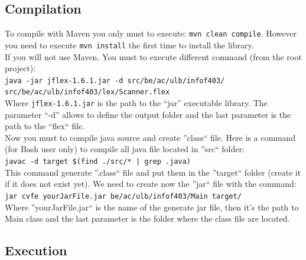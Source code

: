 \documentclass[a4paper,11pt]{article}
\begin{document}
  \subsection{Compilation}
    To compile with Maven you only must to execute: \verb|mvn clean compile|.  However you need to execute \verb|mvn install| the first time to install the library.\\
    If you will not use Maven.  You must to execute different command (from the root project):\\
    \verb|java -jar jflex-1.6.1.jar -d src/be/ac/ulb/infof403/ src/be/ac/ulb/infof403/lex/Scanner.flex|\\
    Where \verb|jflex-1.6.1.jar| is the path to the ``jar'' executable library.  The parameter ``-d'' allows to define the output folder and the last parameter is the path to the ``flex`` file.\\
    Now you must to compile java source and create ''class`` file.  Here is a command (for Bash user only) to compile all java file located in ''src`` folder:\\
    \verb=javac -d target $(find ./src/* | grep .java)=\\
    This command generate ''.class`` file and put them in the ''target`` folder (create it if it does not exist yet).  We need to create now the ''jar`` file with the command:\\
    \verb|jar cvfe yourJarFile.jar be/ac/ulb/infof403/Main target/|\\
    Where ''yourJarFile.jar`` is the name of the generate jar file, then it's the path to Main class and the last parameter is the folder where the class file are located.
    
    
  \subsection{Execution}
    
\end{document}
